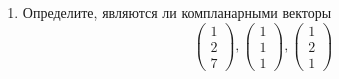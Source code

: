 \begin{enumerate}
    \item Определите, являются ли компланарными векторы
    \[
        \begin{pmatrix}
            1 \\ 2 \\ 7
        \end{pmatrix},
        \begin{pmatrix}
            1 \\ 1 \\ 1
        \end{pmatrix},
        \begin{pmatrix}
            1 \\ 2 \\ 1
        \end{pmatrix}
    \]

    
\end{enumerate}
